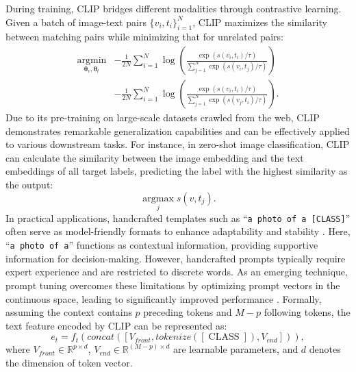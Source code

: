 During training, CLIP bridges different modalities through contrastive learning. Given a batch of image-text pairs $\{v_i, t_i\}_{i=1}^{N}$, CLIP maximizes the similarity between matching pairs while minimizing that for unrelated pairs:
\begin{equation}
\begin{split}
\mathop{\arg\min}\limits_{\boldsymbol{\theta}_v, \boldsymbol{\theta}_t} &-\frac{1}{2N}\sum_{i=1}^{N} \log \left( \frac{\exp(s(v_i, t_i)/\tau)}{\sum_{j=1}^{N} \exp(s(v_i, t_j)/\tau)} \right) \\
&-\frac{1}{2N}\sum_{i=1}^{N} \log \left( \frac{\exp(s(v_i, t_i)/\tau)}{\sum_{j=1}^{N} \exp(s(v_j, t_i)/\tau)} \right). 
\end{split}
\end{equation}
Due to its pre-training on large-scale datasets crawled from the web, CLIP demonstrates remarkable generalization capabilities and can be effectively applied to various downstream tasks. For instance, in zero-shot image classification, CLIP can calculate the similarity between the image embedding and the text embeddings of all target labels, predicting the label with the highest similarity as the output:
\begin{equation}
\mathop{\arg\max}\limits_{j} s(v, t_j).
\end{equation}
In practical applications, handcrafted templates such as “\texttt{a photo of a [CLASS]}” often serve as model-friendly formats to enhance adaptability and stability \cite{huang2023sentence, radford2021learning}. Here, “\texttt{a photo of a}” functions as contextual information, providing supportive information for decision-making. However, handcrafted prompts typically require expert experience and are restricted to discrete words. As an emerging technique, prompt tuning overcomes these limitations by optimizing prompt vectors in the continuous space, leading to significantly improved performance \cite{zhou2022learning}. Formally, assuming the context contains $p$ preceding tokens and $M-p$ following tokens, the text feature encoded by CLIP can be represented as:
\begin{equation}
    e_t=f_t(concat([V_{front}, tokenize([\operatorname{CLASS}]), V_{end}])),
    \label{eq:context}
\end{equation}
where $V_{front} \in \mathbb{R}^{p \times d}$, $V_{end} \in \mathbb{R}^{(M-p) \times d}$ are learnable parameters, and $d$ denotes the dimension of token vector.



